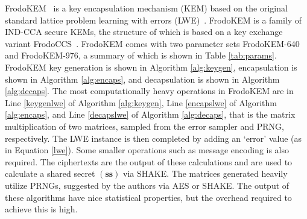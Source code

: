 FrodoKEM~\cite{frodokem} is a key encapsulation mechanism (KEM) based on the original standard lattice problem learning with errors (LWE)~\cite{Regev05}. FrodoKEM is a family of IND-CCA secure KEMs, the structure of which is based on a key exchange variant FrodoCCS~\cite{frodoccs}. FrodoKEM comes with two parameter sets FrodoKEM-640 and FrodoKEM-976, a summary of which is shown in Table \ref{tab:params}. FrodoKEM key generation is shown in Algorithm \ref{alg:keygen}, encapsulation is shown in Algorithm \ref{alg:encaps}, and decapsulation is shown in Algorithm \ref{alg:decaps}. The most computationally heavy operations in FrodoKEM are in Line \ref{keygenlwe} of Algorithm \ref{alg:keygen}, Line \ref{encapslwe} of Algorithm \ref{alg:encaps}, and Line \ref{decapslwe} of Algorithm \ref{alg:decaps}, that is the matrix multiplication of two matrices, sampled from the error sampler and PRNG, respectively. The LWE instance is then completed by adding an `error' value (as in Equation \ref{lwe}). Some smaller operations such as message encoding is also required. The ciphertexts are the output of these calculations and are used to calculate a shared secret $(\mathbf{ss})$ via SHAKE. The matrices generated heavily utilize PRNGs, suggested by the authors via AES or SHAKE. The output of these algorithms have nice statistical properties, but the overhead required to achieve this is high.

\begin{table}[tbhp]
\caption{Implemented \textsf{FrodoKEM} parameter sets.}
\label{tab:params}
\begin{center}
\resizebox{\columnwidth}{!}{

\begin{tabular}{l c c c c r}%
\hline \Tstrut

& Security
& $n$
& $q$
& $\sigma$
& {Ciphertext Size} \\

\hline \Tstrut
\textsf{FrodoKEM-640} & 128-bit &  640 & {$2^{15}$} & 2.8 & {9,720 Bytes} \\ 
\textsf{FrodoKEM-976} & 192-bit & 976  & {$2^{16}$} & 2.3 & {15,744 Bytes} \\
\hline \Tstrut
\end{tabular}}
\end{center}
\end{table}

